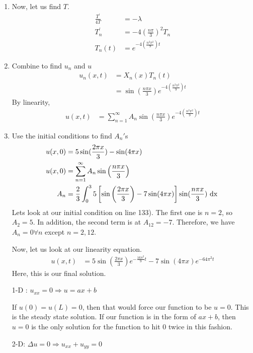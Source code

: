 \documentclass{article}
\begin{document}
\begin{enumerate}
  \item Now, let us find $T$.
  \begin{align}
    \frac{T^\prime}{4T} & = -\lambda\\
    T^\prime_n & = -4 \left( \frac{n \pi}{3} \right)^2 T_n\\
    T_n(t) & = e^{-4 \left( \frac{n^2 \pi^2}{9} \right)t}
  \end{align}
  \item Combine to find $u_n$ and $u$
  \begin{align}
    u_n(x, t) & = X_n(x)T_n(t)\\
    & = \sin\left( \frac{n \pi x}{3} \right) e^{-4 \left( \frac{n^2 \pi^2}{9} \right)t}
  \end{align}
  By linearity,
  \begin{align}
    u(x, t) & = \sum^\infty_{n = 1} A_n \sin\left( \frac{n \pi x}{3} \right) e^{-4 \left( \frac{n^2 \pi^2}{9} \right)t}
  \end{align}
  \item Use the initial conditions to find $A_n'$s
  \begin{align}
    u(x, 0) & = 5\sin(\frac{2 \pi x}{3}) - \sin(4 \pi x)\\
    u(x, 0) & = \sum^\infty_{n = 1} A_n \sin\left( \frac{n \pi x}{3} \right)\\
    A_n & = \frac{2}{3} \int^3_0 5 \left[\sin\left( \frac{2 \pi x}{3} \right) - 7 \sin(4 \pi x) \right] \sin(\frac{n \pi x}{3}) \text{ dx }
  \end{align}
  Lets look at our initial condition on line 133). The first one is $n =2$, so $A_2 = 5$. In addition, the second term is at $A_12 = -7$. Therefore, we have $A_n = 0 \forall n$ except $n = 2, 12$.

  Now, let us look at our linearity equation.
  \begin{align}
    u(x, t) & = 5 \sin\left( \frac{2 \pi x}{3} \right) e^{-\frac{16 \pi^2}{9} t} - 7 \sin\left( 4 \pi x \right) e^{-64 \pi^2 t}
  \end{align}
  Here, this is our final solution.

  1-D : $u_{xx} = 0 \Rightarrow u = ax + b$

  If $u(0) = u(L) = 0$, then that would force our function to be $u = 0$. This is the steady state solution. If our function is in the form of $ax + b$, then $u = 0$ is the only solution for the function to hit $0$ twice in this fashion.

  2-D: $\Delta u = 0 \Rightarrow u_{xx} + u_{yy} = 0$


\end{enumerate}
\end{document}
